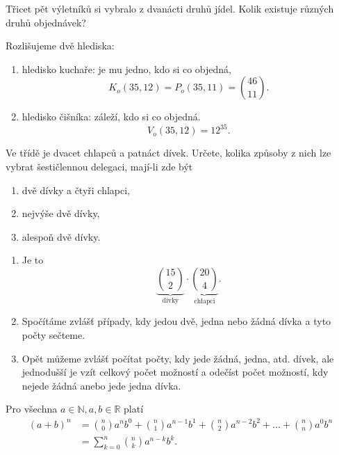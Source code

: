 \begin{priklad}
Třicet pět výletníků si vybralo z dvanácti druhů jídel. Kolik existuje
různých druhů objednávek?
\end{priklad}

\begin{reseni}
Rozlišujeme dvě hlediska:
\begin{enumerate}[$i.$]
\item hledisko kuchaře: je mu jedno, kdo si co objedná,
$$K_o(35,12)=P_o(35,11)=\binom{46}{11}.$$
\item hledisko čišníka: záleží, kdo si co objedná.
$$V_o(35,12)=12^{35}.$$
\end{enumerate}
\end{reseni}

\begin{priklad}
Ve třídě je dvacet chlapců a patnáct dívek. Určete, kolika způsoby z nich lze vybrat
šestičlennou delegaci, mají-li zde být
\begin{enumerate}[$a.$]
\item dvě dívky a čtyři chlapci,
\item nejvýše dvě dívky,
\item alespoň dvě dívky.
\end{enumerate}
\end{priklad}

\begin{reseni}
\begin{enumerate}[$a.$]
\item Je to
$$\underbrace{\binom{15}{2}}_{\textrm{dívky}} \cdot \underbrace{\binom{20}{4}}_{\textrm{chlapci}}.$$
\item Spočítáme zvlášť případy, kdy jedou dvě, jedna nebo žádná dívka a tyto počty sečteme.
\item Opět můžeme zvlášť počítat počty, kdy jede žádná, jedna, atd. dívek, ale jednodušší
je vzít celkový počet možností a odečíst počet možností, kdy nejede žádná anebo jede
jedna dívka.
\end{enumerate}
\end{reseni}

\begin{veta}
    Pro všechna $a \in \mathbb N, a,b \in \mathbb R$ platí
    \begin{align*}
        (a+b)^n & = \binom{n}{0}a^nb^0 + \binom{n}{1}a^{n-1}b^1 + \binom{n}{2}
        a^{n-2}b^2 + \dots + \binom{n}{n}a^0b^n \\
        &= \sum_{k=0}^n \binom{n}{k}a^{n-k}b^k.
    \end{align*}
\end{veta}

